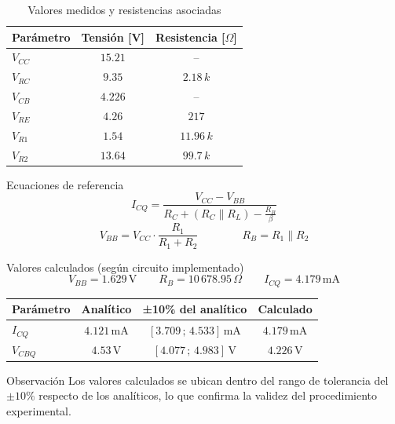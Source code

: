 \begin{frame}{}
  \begin{table}[H]
    \centering
    \caption{Valores medidos y resistencias asociadas}
    \begin{tabular}{lcc}
    \toprule
    \textbf{Parámetro} & \textbf{Tensión [V]} & \textbf{Resistencia [\(\Omega\)]} \\
    \midrule
    $V_{CC}$ & $15.21$ & -- \\
    $V_{RC}$ & $9.35$  & $2.18\,k$ \\
    $V_{CB}$ & $4.226$ & -- \\
    $V_{RE}$ & $4.26$  & $217$ \\
    $V_{R1}$ & $1.54$  & $11.96\,k$ \\
    $V_{R2}$ & $13.64$ & $99.7\,k$ \\
    \bottomrule
    \end{tabular}
  \end{table}
\end{frame}


\begin{frame}{}

  \begin{block}{Ecuaciones de referencia}
    \[
      I_{CQ} = \frac{V_{CC} - V_{BB}}{R_C + (R_C \parallel R_L) - \tfrac{R_B}{\beta}}
    \]
    \[
      V_{BB} = V_{CC}\cdot \frac{R_1}{R_1 + R_2}
      \qquad\qquad
      R_B = R_1 \parallel R_2
    \]
  \end{block}

  \begin{block}{Valores calculados (según circuito implementado)}
    \[
      V_{BB} = 1.629 \,\text{V}
      \qquad
      R_B = 10\,678.95 \,\Omega
      \qquad
      I_{CQ} = 4.179 \,\text{mA}
    \]
  \end{block}

\end{frame}


\begin{frame}{}

  \begin{table}[H]
  \centering
  \begin{tabular}{lccc}
    \toprule
    \textbf{Parámetro} & \textbf{Analítico} & \textbf{±10\% del analítico} & \textbf{Calculado} \\
    \midrule
    $I_{CQ}$  & $4.121\,\text{mA}$ & $[3.709\,;\,4.533]\,\text{mA}$ & $4.179\,\text{mA}$ \\
    $V_{CBQ}$ & $4.53\,\text{V}$   & $[4.077\,;\,4.983]\,\text{V}$  & $4.226\,\text{V}$ \\
    \bottomrule
  \end{tabular}
  \end{table}

  \vspace{1em}

  \begin{block}{Observación}
    Los valores calculados se ubican dentro del rango de tolerancia del
    $\pm 10\%$ respecto de los analíticos, lo que confirma la validez del
    procedimiento experimental.
  \end{block}

\end{frame}




